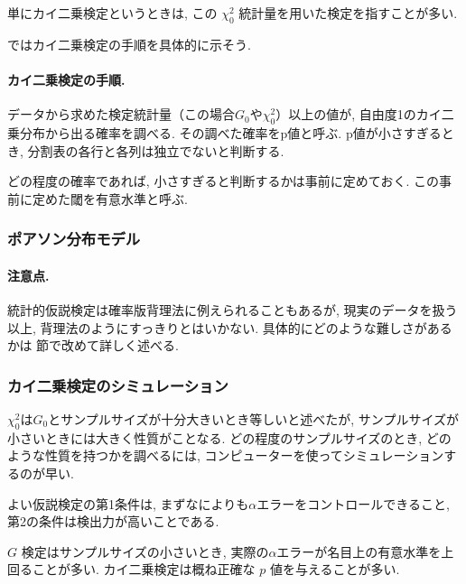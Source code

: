 \documentclass{jarticle}
\begin{document}
単にカイ二乗検定というときは, この $\chi^2_0$ 統計量を用いた検定を指すことが多い. 

ではカイ二乗検定の手順を具体的に示そう. 

\paragraph{カイ二乗検定の手順.}
データから求めた検定統計量（この場合$G_0$や$\chi^2_0$）以上の値が, 自由度1のカイ二乗分布から出る確率を調べる. その調べた確率をp値と呼ぶ.
p値が小さすぎるとき, 分割表の各行と各列は独立でないと判断する.

どの程度の確率であれば, 小さすぎると判断するかは事前に定めておく. この事前に定めた閾を有意水準と呼ぶ.

\subsubsection{ポアソン分布モデル}

\paragraph{注意点.}
統計的仮説検定は確率版背理法に例えられることもあるが, 現実のデータを扱う以上, 背理法のようにすっきりとはいかない. 
具体的にどのような難しさがあるかは 節で改めて詳しく述べる. 

\subsubsection{カイ二乗検定のシミュレーション}
$\chi^2_0$は$G_0$とサンプルサイズが十分大きいとき等しいと述べたが, サンプルサイズが小さいときには大きく性質がことなる.
どの程度のサンプルサイズのとき, どのような性質を持つかを調べるには, コンピューターを使ってシミュレーションするのが早い. 

よい仮説検定の第1条件は, まずなによりも$\alpha$エラーをコントロールできること, 第2の条件は検出力が高いことである. 

$G$ 検定はサンプルサイズの小さいとき, 実際の$\alpha$エラーが名目上の有意水準を上回ることが多い. 
カイ二乗検定は概ね正確な $p$ 値を与えることが多い.
\end{document}
